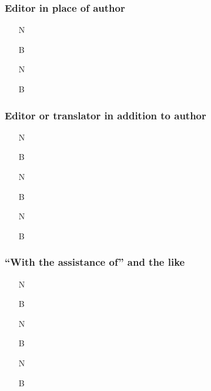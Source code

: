 \documentclass[11pt,letterpaper,oneside]{article}
\begin{document}
\setcounter{subsubsection}{86}
\subsubsection{Editor in place of author}
\label{14.87}

\begin{itemize}
\item[N] 

\item[B] 

\item[N] 

\item[B] 
\end{itemize}

\subsubsection{Editor or translator in addition to author}
\label{14.88}

\begin{itemize}
\item[N] 

\item[B] 

\item[N] 

\item[B] 

\item[N] 

\item[B] 
\end{itemize}

\subsubsection{``With the assistance of'' and the like}


\begin{itemize}
\item[N] 

\item[B] 

\item[N] 

\item[B] 

\item[N] 

\item[B] 
\end{itemize}
\end{document}
